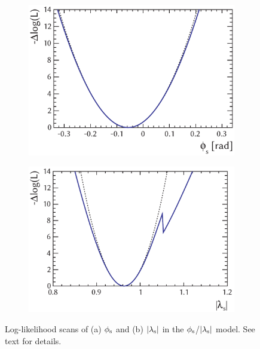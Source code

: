 \begin{figure}[tbp]
  \centering
  \begin{subfigure}{0.49\textwidth}
    \includegraphics[width=\textwidth]{graphics/results/NLL_lamb_phi_phiCP}
    \caption{}
  \end{subfigure}
  \hfill%
  \begin{subfigure}{0.49\textwidth}
    \includegraphics[width=\textwidth]{graphics/results/NLL_lamb_phi_lambdaCP}
    \caption{}
  \end{subfigure}

  \caption{Log-likelihood scans of (a) $\phi_\text{s}$ and (b) $|{\lambda_{\text{s}}}|$ in the $\phi_\text{s}$/$|{\lambda_{\text{s}}}|$ model. See text for details.}
  \label{fig:NLL_CPV_phisLamsAbs}
\end{figure}

